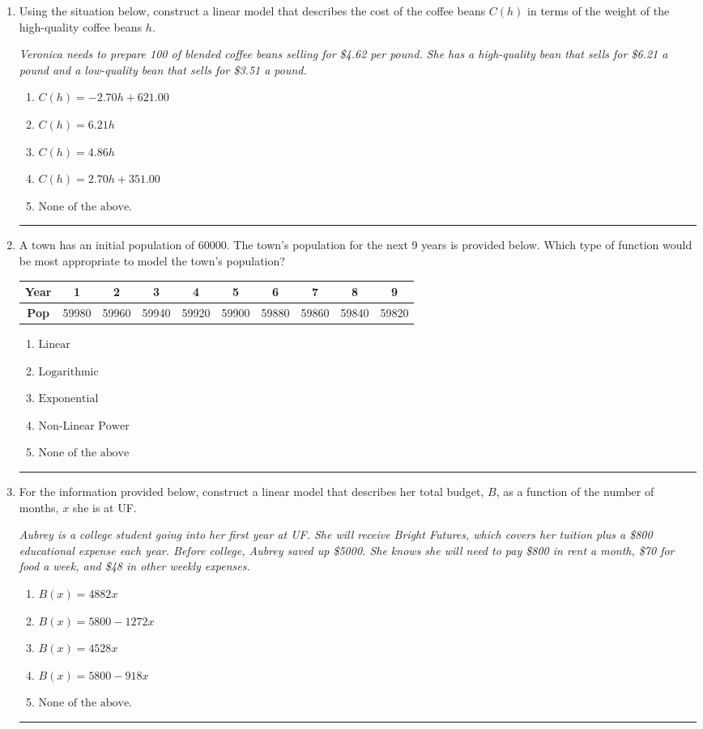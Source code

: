 \documentclass[14pt]{extbook}
\newcommand{\litem}[1]{\item#1\hspace*{-1cm}\rule{\textwidth}{0.4pt}}
\begin{document}
\begin{enumerate}
{\begin{enumerate}[label=\Alph*.]
\end{enumerate} }
\litem{
Using the situation below, construct a linear model that describes the cost of the coffee beans $C(h)$ in terms of the weight of the high-quality coffee beans $h$.
\begin{center}
    \textit{ Veronica needs to prepare 100 of blended coffee beans selling for \$4.62 per pound. She has a high-quality bean that sells for \$6.21 a pound and a low-quality bean that sells for \$3.51 a pound. }
\end{center}
\begin{enumerate}[label=\Alph*.]
\item \( C(h) = -2.70 h + 621.00 \)
\item \( C(h) = 6.21 h \)
\item \( C(h) = 4.86 h \)
\item \( C(h) = 2.70 h + 351.00 \)
\item \( \text{None of the above.} \)

\end{enumerate} }
\litem{
A town has an initial population of 60000. The town's population for the next 9 years is provided below. Which type of function would be most appropriate to model the town's population?

\begin{tabular}{c|c|c|c|c|c|c|c|c|c}
\textbf{Year} &1 &2 &3 &4 &5 &6 &7 &8 &9\tabularnewline \hline
\textbf{Pop} &59980 &59960 &59940 &59920 &59900 &59880 &59860 &59840 &59820\end{tabular}\begin{enumerate}[label=\Alph*.]
\item \( \text{Linear} \)
\item \( \text{Logarithmic} \)
\item \( \text{Exponential} \)
\item \( \text{Non-Linear Power} \)
\item \( \text{None of the above} \)

\end{enumerate} }
\litem{
For the information provided below, construct a linear model that describes her total budget, $B$, as a function of the number of months, $x$ she is at UF.
\begin{center}
    \textit{ Aubrey is a college student going into her first year at UF. She will receive Bright Futures, which covers her tuition plus a \$800 educational expense each year. Before college, Aubrey saved up \$5000. She knows she will need to pay \$800 in rent a month, \$70 for food a week, and \$48 in other weekly expenses. }
\end{center}
\begin{enumerate}[label=\Alph*.]
\item \( B(x) = 4882 x \)
\item \( B(x) = 5800 - 1272 x \)
\item \( B(x) = 4528 x \)
\item \( B(x) = 5800 - 918 x \)
\item \( \text{None of the above.} \)


\end{enumerate}}
\end{enumerate}
\end{document}
